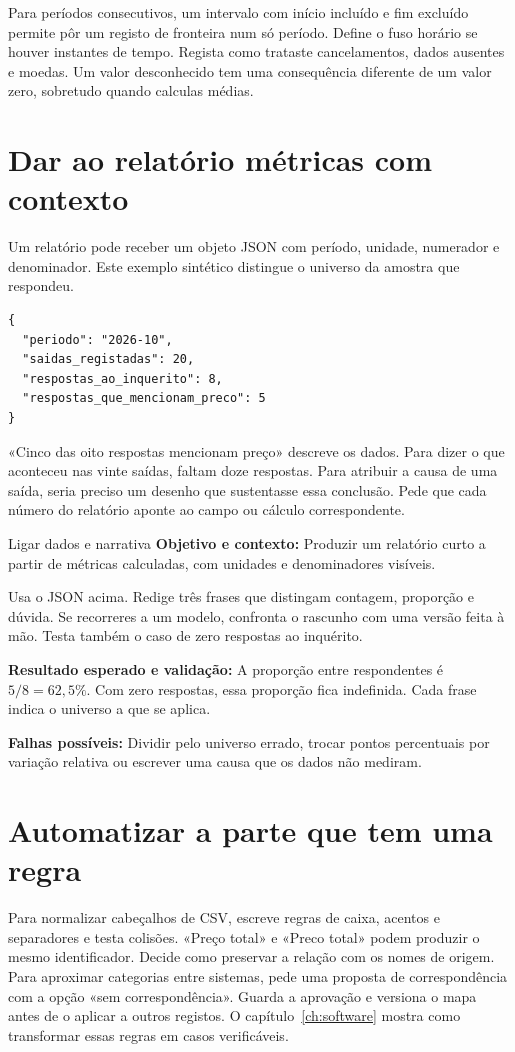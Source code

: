 Para períodos consecutivos, um intervalo com início incluído e fim excluído permite pôr um registo de fronteira num só período. Define o fuso horário se houver instantes de tempo. Regista como trataste cancelamentos, dados ausentes e moedas. Um valor desconhecido tem uma consequência diferente de um valor zero, sobretudo quando calculas médias.

\section{Dar ao relatório métricas com contexto}

Um relatório pode receber um objeto JSON com período, unidade, numerador e denominador. Este exemplo sintético distingue o universo da amostra que respondeu.

\begin{lstlisting}
{
  "periodo": "2026-10",
  "saidas_registadas": 20,
  "respostas_ao_inquerito": 8,
  "respostas_que_mencionam_preco": 5
}
\end{lstlisting}

«Cinco das oito respostas mencionam preço» descreve os dados. Para dizer o que aconteceu nas vinte saídas, faltam doze respostas. Para atribuir a causa de uma saída, seria preciso um desenho que sustentasse essa conclusão. Pede que cada número do relatório aponte ao campo ou cálculo correspondente.

\begin{promptlabbox}{Ligar dados e narrativa}
\textbf{Objetivo e contexto:} Produzir um relatório curto a partir de métricas calculadas, com unidades e denominadores visíveis.

Usa o JSON acima. Redige três frases que distingam contagem, proporção e dúvida. Se recorreres a um modelo, confronta o rascunho com uma versão feita à mão. Testa também o caso de zero respostas ao inquérito.

\textbf{Resultado esperado e validação:} A proporção entre respondentes é $5/8=62{,}5\%$. Com zero respostas, essa proporção fica indefinida. Cada frase indica o universo a que se aplica.

\textbf{Falhas possíveis:} Dividir pelo universo errado, trocar pontos percentuais por variação relativa ou escrever uma causa que os dados não mediram.
\end{promptlabbox}

\section{Automatizar a parte que tem uma regra}

Para normalizar cabeçalhos de CSV, escreve regras de caixa, acentos e separadores e testa colisões. «Preço total» e «Preco total» podem produzir o mesmo identificador. Decide como preservar a relação com os nomes de origem. Para aproximar categorias entre sistemas, pede uma proposta de correspondência com a opção «sem correspondência». Guarda a aprovação e versiona o mapa antes de o aplicar a outros registos. O capítulo~\ref{ch:software} mostra como transformar essas regras em casos verificáveis.
